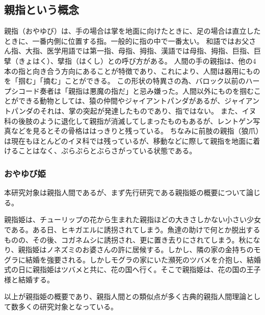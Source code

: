 \documentclass[12pt]{jsarticle}
\begin{document}
\subsection{親指という概念}
親指（おやゆび）は、手の場合は掌を地面に向けたときに、足の場合は直立したときに、一番内側に位置する指。一般的に指の中で一番太い。
和語ではお父さん指、大指、医学用語では第一指、母指、拇指、漢語では母指、拇指、巨指、巨擘（きょはく）、擘指（はくし）との呼び方がある。
人間の手の親指は、他の4本の指と向き合う方向にあることが特徴であり、これにより、人間は器用にものを「掴む」「摘む」ことができる。
この形状の特異さの為、バロック以前のハープシコード奏者は「親指は悪魔の指だ」と忌み嫌った。人間以外にものを掴むことができる動物としては、猿の仲間やジャイアントパンダがあるが、ジャイアントパンダのそれは、掌の突起が発達したものであり、指ではない。
また、イヌ科の後肢のように退化して親指が消滅してしまったものもあるが、レントゲン写真などを見るとその骨格ははっきりと残っている。
ちなみに前肢の親指（狼爪）は現在もほとんどのイヌ科では残っているが、移動などに際して親指を地面に着けることはなく、ぷらぷらとぶらさがっている状態である。

\subsubsection{おやゆび姫}
本研究対象は親指人間であるが、まず先行研究である親指姫の概要について論じる。\par
親指姫は、チューリップの花から生まれた親指ほどの大きさしかない小さい少女である。ある日、ヒキガエルに誘拐されてしまう。魚達の助けで何とか脱出するものの、その後、コガネムシに誘拐され、更に置き去りにされてしまう。秋になり、親指姫はノネズミのお婆さんの許に居候する。しかし、隣の家の金持ちのモグラに結婚を強要される。しかしモグラの家にいた瀕死のツバメを介抱し、結婚式の日に親指姫はツバメと共に、花の国へ行く。そこで親指姫は、花の国の王子様と結婚する。\par

以上が親指姫の概要であり、親指人間との類似点が多く古典的親指人間理論として数多くの研究対象となっている。

\end{document}
